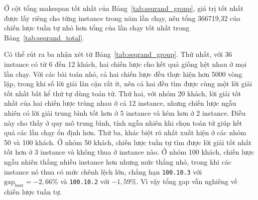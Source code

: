 \documentclass[../DoAn.tex]{subfiles}
\begin{document}
\begin{table}[H]
\centering
\caption{So sánh hai chiến lược theo nhóm kích thước}
\label{tab:seqrand_group}
\end{table}

Ở cột tổng makespan tốt nhất của Bảng~\ref{tab:seqrand_group}, giá trị tốt nhất được lấy riêng cho từng instance trong năm lần chạy, nên tổng 366719,32 của chiến lược tuần tự nhỏ hơn tổng của lần chạy tốt nhất trong Bảng~\ref{tab:seqrand_total}.

Có thể rút ra ba nhận xét từ Bảng~\ref{tab:seqrand_group}. Thứ nhất, với 36 instance có từ 6 đến 12 khách, hai chiến lược cho kết quả giống hệt nhau ở mọi lần chạy. Với các bài toán nhỏ, cả hai chiến lược đều thực hiện hơn 5000 vòng lặp, trong khi số lời giải lân cận rất ít, nên cả hai đều tìm được cùng một lời giải tốt nhất bất kể thứ tự dùng toán tử. Thứ hai, với nhóm 20 khách, lời giải tốt nhất của hai chiến lược trùng nhau ở cả 12 instance, nhưng chiến lược ngẫu nhiên có lời giải trung bình tốt hơn ở 5 instance và kém hơn ở 2 instance. Điều này cho thấy ở quy mô trung bình, tính ngẫu nhiên khi chọn toán tử giúp kết quả các lần chạy ổn định hơn. Thứ ba, khác biệt rõ nhất xuất hiện ở các nhóm 50 và 100 khách. Ở nhóm 50 khách, chiến lược tuần tự tìm được lời giải tốt nhất tốt hơn ở 3 instance và không thua ở instance nào. Ở nhóm 100 khách, chiến lược ngẫu nhiên thắng nhiều instance hơn nhưng mức thắng nhỏ, trong khi các instance nó thua có mức chênh lệch lớn, chẳng hạn \texttt{100.10.3} với $\mathrm{gap}_{\text{best}} = -2{,}66\%$ và \texttt{100.10.2} với $-1{,}59\%$. Vì vậy tổng gap vẫn nghiêng về chiến lược tuần tự.
\end{document}
